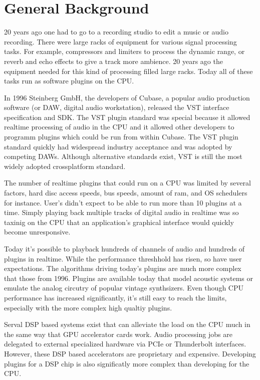 \section{General Background}

20 years ago one had to go to a recording studio to edit a music or audio recording. There were large racks of equipment for various signal processing tasks. For example, compressors and limiters to process the dynamic range, or reverb and echo effects to give a track more ambience.
20 years ago the equipment needed for this kind of processing filled large racks. Today all of these tasks run as software plugins on the CPU.

In 1996 Steinberg GmbH, the developers of Cubase, a popular audio production software (or DAW, digital audio workstation), released the VST interface specification and SDK.\cite{VST-wikipedia} The VST plugin standard was special because it allowed realtime processing of audio in the CPU and it allowed other developers to programm plugins which could be run from within Cubase. The VST plugin standard quickly had widespread industry acceptance and was adopted by competing DAWs. Although alternative standards exist, VST is still the most widely adopted crossplatform standard.

The number of realtime plugins that could run on a CPU was limited by several factors, hard disc access speeds, bus speeds, amount of ram, and OS schedulers for instance\cite{brandt1998low}. User's didn't expect to be able to run more than 10 plugins at a time. Simply playing back multiple tracks of digital audio in realtime was so taxinig on the CPU that an application's graphical interface would quickly become unresponsive.

Today it's possible to playback hundreds of channels of audio and hundreds of plugins in realtime. While the performance threshhold has risen, so have user expectations. The algorithms driving today's plugins are much more complex that those from 1996. Plugins are available today that model acoustic systems or emulate the analog circutry of popular vintage synthsizers. Even though CPU performance has increased significantly, it's still easy to reach the limits, especially with the more complex high qualtiy plugins.

Serval DSP based systems exist that can alleviate the load on the CPU much in the same way that GPU accelerator cards work. Audio processing jobs are delegated to external specialized hardware via PCIe or Thunderbolt interfaces. However, these DSP based accelerators are proprietary and expensive. Developing plugins for a DSP chip is also significatly more complex than developing for the CPU.

